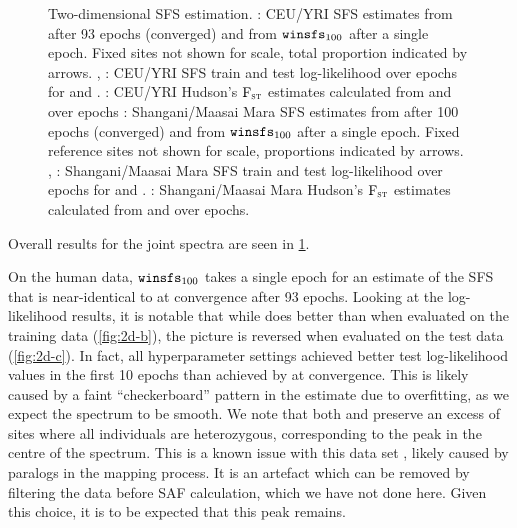 \begin{figure}
    {
        \label{fig:2d-a}
        \label{fig:2d-b}
        \label{fig:2d-c}
        \label{fig:2d-d}
        \label{fig:2d-e}
        \label{fig:2d-f}
        \label{fig:2d-g}
        \label{fig:2d-h}
    }
    \begin{center}
    \end{center}
    \caption{
        Two-dimensional SFS estimation.
        :
            CEU/YRI SFS estimates from \realsfs after \num{93} epochs (converged) and from $\winsfs[100]$ after a single epoch.
            Fixed sites not shown for scale, total proportion indicated by arrows.
        , :
            CEU/YRI SFS train and test log-likelihood over epochs for \realsfs and \winsfs.
        :
            CEU/YRI Hudson's $\text{F}_{\textsc{st}}$ estimates calculated from \realsfs and \winsfs over epochs
        :
            Shangani/Maasai Mara SFS estimates from \realsfs after \num{100} epochs (converged) and from $\winsfs[100]$ after a single epoch.
            Fixed reference sites not shown for scale, proportions indicated by arrows.
        , :
            Shangani/Maasai Mara SFS train and test log-likelihood over epochs for \realsfs and \winsfs.
        :
            Shangani/Maasai Mara Hudson's $\text{F}_{\textsc{st}}$ estimates calculated from \realsfs and \winsfs over epochs.
    }
    \label{fig:2d}
\end{figure}

Overall results for the joint spectra are seen in \cref{fig:2d}.

On the human data, $\winsfs[100]$ takes a single epoch for an estimate of the SFS that is near-identical to \realsfs at convergence after \num{93} epochs.
Looking at the log-likelihood results, it is notable that while \realsfs does better than \winsfs when evaluated on the training data (\cref{fig:2d-b}), the picture is reversed when evaluated on the test data (\cref{fig:2d-c}).
In fact, all \winsfs hyperparameter settings achieved better test log-likelihood values in the first \num{10} epochs than achieved by \realsfs at convergence.
This is likely caused by a faint \enquote{checkerboard} pattern in the \realsfs estimate due to overfitting, as we expect the spectrum to be smooth.
We note that both \realsfs and \winsfs preserve an excess of sites where all individuals are heterozygous, corresponding to the peak in the centre of the spectrum.
This is a known issue with this data set \cite{Meisner2019}, likely caused by paralogs in the mapping process.
It is an artefact which can be removed by filtering the data before SAF calculation, which we have not done here.
Given this choice, it is to be expected that this peak remains.

